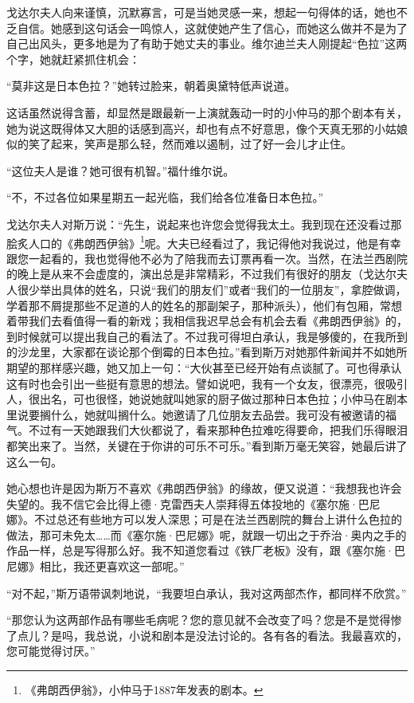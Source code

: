 \par 戈达尔夫人向来谨慎，沉默寡言，可是当她灵感一来，想起一句得体的话，她也不乏自信。她感到这句话会一鸣惊人，这就使她产生了信心，而她这么做并不是为了自己出风头，更多地是为了有助于她丈夫的事业。维尔迪兰夫人刚提起“色拉”这两个字，她就赶紧抓住机会：
\par “莫非这是日本色拉？”她转过脸来，朝着奥黛特低声说道。
\par 这话虽然说得含蓄，却显然是跟最新一上演就轰动一时的小仲马的那个剧本有关，她为说这既得体又大胆的话感到高兴，却也有点不好意思，像个天真无邪的小姑娘似的笑了起来，笑声是那么轻，然而难以遏制，过了好一会儿才止住。
\par “这位夫人是谁？她可很有机智。”福什维尔说。
\par “不，不过各位如果星期五一起光临，我们给各位准备日本色拉。”
\par 戈达尔夫人对斯万说：“先生，说起来也许您会觉得我太土。我到现在还没看过那脍炙人口的《弗朗西伊翁》\footnote{《弗朗西伊翁》，小仲马于1887年发表的剧本。}呢。大夫已经看过了，我记得他对我说过，他是有幸跟您一起看的，我也觉得他不必为了陪我而去订票再看一次。当然，在法兰西剧院的晚上是从来不会虚度的，演出总是非常精彩，不过我们有很好的朋友（戈达尔夫人很少举出具体的姓名，只说“我们的朋友们”或者“我们的一位朋友”，拿腔做调，学着那不屑提那些不足道的人的姓名的那副架子，那种派头），他们有包厢，常想着带我们去看值得一看的新戏；我相信我迟早总会有机会去看《弗朗西伊翁》的，到时候就可以提出我自己的看法了。不过我可得坦白承认，我是够傻的，在我所到的沙龙里，大家都在谈论那个倒霉的日本色拉。”看到斯万对她那件新闻并不如她所期望的那样感兴趣，她又加上一句：“大伙甚至已经开始有点谈腻了。可也得承认这有时也会引出一些挺有意思的想法。譬如说吧，我有一个女友，很漂亮，很吸引人，很出名，可也很怪，她说她就叫她家的厨子做过那种日本色拉；小仲马在剧本里说要搁什么，她就叫搁什么。她邀请了几位朋友去品尝。我可没有被邀请的福气。不过有一天她跟我们大伙都说了，看来那种色拉难吃得要命，把我们乐得眼泪都笑出来了。当然，关键在于你讲的可乐不可乐。”看到斯万毫无笑容，她最后讲了这么一句。
\par 她心想也许是因为斯万不喜欢《弗朗西伊翁》的缘故，便又说道：“我想我也许会失望的。我不信它会比得上德·克雷西夫人崇拜得五体投地的《塞尔施·巴尼娜》。不过总还有些地方可以发人深思；可是在法兰西剧院的舞台上讲什么色拉的做法，那可未免太……而《塞尔施·巴尼娜》呢，就跟一切出之于乔治·奥内之手的作品一样，总是写得那么好。我不知道您看过《铁厂老板》没有，跟《塞尔施·巴尼娜》相比，我还更喜欢这一部呢。”
\par “对不起，”斯万语带讽刺地说，“我要坦白承认，我对这两部杰作，都同样不欣赏。”
\par “那您认为这两部作品有哪些毛病呢？您的意见就不会改变了吗？您是不是觉得惨了点儿？是吗，我总说，小说和剧本是没法讨论的。各有各的看法。我最喜欢的，您可能觉得讨厌。”
